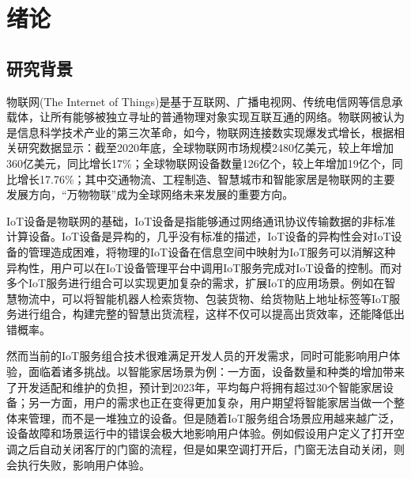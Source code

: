 \documentclass[winfonts,master,twoside]{njuthesis}
\begin{document}
\listoftables

\mainmatter

\chapter{绪论}\label{chapter_introduction}
\section{研究背景}
物联网(The Internet of Things)\cite{iot}是基于互联网、广播电视网、传统电信网等信息承载体，让所有能够被独立寻址的普通物理对象实现互联互通的网络。物联网被认为是信息科学技术产业的第三次革命，如今，物联网连接数实现爆发式增长，根据相关研究数据\cite{smarthometrend}显示：截至2020年底，全球物联网市场规模2480亿美元，较上年增加360亿美元，同比增长17\%；全球物联网设备数量126亿个，较上年增加19亿个，同比增长17.76\%；其中交通物流、工程制造、智慧城市和智能家居是物联网的主要发展方向，“万物物联”成为全球网络未来发展的重要方向。


IoT设备是物联网的基础，IoT设备\cite{broring2011new}是指能够通过网络通讯协议传输数据的非标准计算设备。IoT设备是异构的，几乎没有标准的描述，IoT设备的异构性会对IoT设备的管理造成困难\cite{atzori2010internet}，将物理的IoT设备在信息空间中映射为IoT服务\cite{huang2016service}可以消解这种异构性，用户可以在IoT设备管理平台中调用IoT服务完成对IoT设备的控制。而对多个IoT服务进行组合可以实现更加复杂的需求，扩展IoT的应用场景\cite{asghari2018service}。例如在智慧物流中\cite{hamzei2018toward}，可以将智能机器人检索货物、包装货物、给货物贴上地址标签等IoT服务进行组合，构建完整的智慧出货流程，这样不仅可以提高出货效率，还能降低出错概率。

然而当前的IoT服务组合技术很难满足开发人员的开发需求，同时可能影响用户体验，面临着诸多挑战。以智能家居场景为例：一方面，设备数量和种类的增加带来了开发适配和维护的负担\cite{brush2011home}，预计到2023年，平均每户将拥有超过30个智能家居设备\cite{alam2012review}；另一方面，用户的需求也正在变得更加复杂，用户期望将智能家居当做一个整体来管理，而不是一堆独立的设备\cite{mennicken2012hacking}。但是随着IoT服务组合场景应用越来越广泛，设备故障和场景运行中的错误会极大地影响用户体验。例如假设用户定义了打开空调之后自动关闭客厅的门窗的流程，但是如果空调打开后，门窗无法自动关闭，则会执行失败，影响用户体验。
\end{document}
